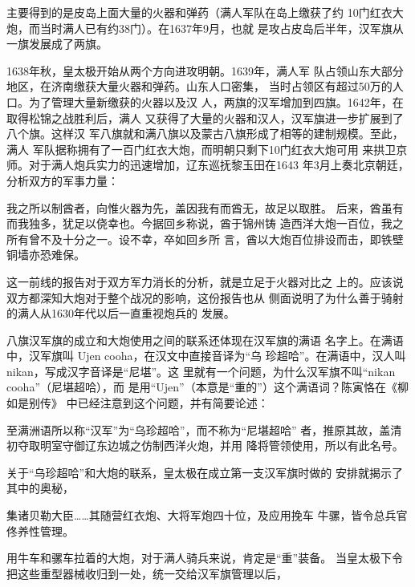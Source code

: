 主要得到的是皮岛上面大量的火器和弹药（满人军队在岛上缴获了约%
10门红衣大炮，而当时满人已有约38门）。在1637年9月，也就%
是攻占皮岛后半年，汉军旗从一旗发展成了两旗。%
\par
1638年秋，皇太极开始从两个方向进攻明朝。1639年，满人军%
队占领山东大部分地区，在济南缴获大量火器和弹药。山东人口密集，%
当时占领区有超过50万的人口。为了管理大量新缴获的火器以及汉%
人，两旗的汉军增加到四旗。1642年，在取得松锦之战胜利后，满人%
又获得了大量的火器和汉人，汉军旗进一步扩展到了八个旗。这样汉%
军八旗就和满八旗以及蒙古八旗形成了相等的建制规模。至此，满人%
军队据称拥有了一百门红衣大炮，而明朝只剩下10门红衣大炮可用%
来拱卫京师。对于满人炮兵实力的迅速增加，辽东巡抚黎玉田在1643%
年3月上奏北京朝廷，分析双方的军事力量：%
\par
{\bookkai 我之所以制酋者，向惟火器为先，盖因我有而酋无，故足以取胜。}%
{\bookkai 后来，酋虽有而我独多，犹足以侥幸也。今据回乡称说，酋于锦州铸}%
{\bookkai 造西洋大炮一百位，我之所有曾不及十分之一。设不幸，卒如回乡所}%
{\bookkai 言，酋以大炮百位排设而击，即铁壁铜墙亦恐难保。}%
\par
这一前线的报告对于双方军力消长的分析，就是立足于火器对比之%
上的。应该说双方都深知大炮对于整个战况的影响，这份报告也从%
侧面说明了为什么善于骑射的满人从1630年代以后一直重视炮兵的%
发展。%
\par
八旗汉军旗的成立和大炮使用之间的联系还体现在汉军旗的满语%
名字上。在满语中，汉军旗叫 Ujen cooha，在汉文中直接音译为“乌%
珍超哈”。在满语中，汉人叫nikan，写成汉字音译是“尼堪”。这%
里就有一个问题，为什么汉军旗不叫“nikan cooha”（尼堪超哈），而%
是用“Ujen”（本意是“重的”）这个满语词？陈寅恪在《柳如是别传》%
中已经注意到这个问题，并有简要论述：%
\par
{\bookkai 至满洲语所以称“汉军”为“乌珍超哈”，而不称为“尼堪超哈”}%
{\bookkai 者，推原其故，盖清初夺取明室守御辽东边城之仿制西洋火炮，并用}%
{\bookkai 降将管领使用，所以有此名号。}%
\par
关于“乌珍超哈”和大炮的联系，皇太极在成立第一支汉军旗时做的%
安排就揭示了其中的奥秘，%
\par
{\bookkai 集诸贝勒大臣……其随营红衣炮、大将军炮四十位，及应用挽车}%
{\bookkai 牛骡，皆令总兵官佟养性管理。}%
\par
用牛车和骡车拉着的大炮，对于满人骑兵来说，肯定是“重”装备。%
当皇太极下令把这些重型器械收归到一处，统一交给汉军旗管理以后，%
